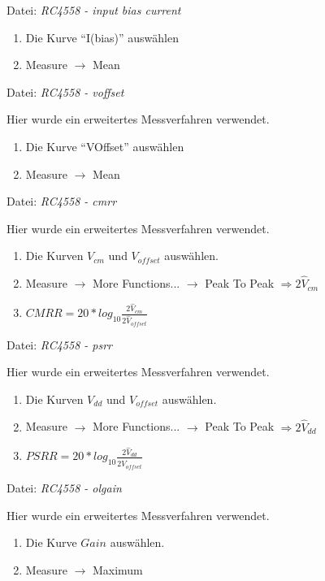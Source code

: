 \documentclass[
	ngerman,
	parskip=half,
	headsepline,
	twocolumn,
	DIV=calc,
	listof=leveldown,
	]{scrartcl}
\begin{document}
	Datei: \emph{RC4558 - input bias current}
	\begin{enumerate}
		\item Die Kurve \enquote{I(bias)} auswählen
		\item Measure $\rightarrow$ Mean
	\end{enumerate}
	
	Datei: \emph{RC4558 - voffset}
	
	Hier wurde ein erweitertes Messverfahren \cite{website:amp_psrr_cmrr_circuits} verwendet.
	\begin{enumerate}
		\item Die Kurve \enquote{VOffset} auswählen
		\item Measure $\rightarrow$ Mean
	\end{enumerate}
	
	Datei: \emph{RC4558 - cmrr}
	
	Hier wurde ein erweitertes Messverfahren \cite{website:amp_psrr_cmrr_circuits} verwendet.
	\begin{enumerate}
		\item Die Kurven $V_{cm}$ und $V_{offset}$ auswählen.
		\item Measure $\rightarrow$ More Functions... $\rightarrow$ Peak To Peak $\Rightarrow 2\hat{V}_{cm}$
		\item $ CMRR = 20 * log_{10} \frac{2\hat{V}_{cm}}{2\hat{V}_{offset}}$
	\end{enumerate}
	
	Datei: \emph{RC4558 - psrr}
	
	Hier wurde ein erweitertes Messverfahren \cite{website:amp_psrr_cmrr_circuits} verwendet.
	\begin{enumerate}
		\item Die Kurven $V_{dd}$ und $V_{offset}$ auswählen.
		\item Measure $\rightarrow$ More Functions... $\rightarrow$ Peak To Peak $\Rightarrow 2\hat{V}_{dd}$
		\item $ PSRR = 20 * log_{10} \frac{2\hat{V}_{dd}}{2\hat{V}_{offset}}$
	\end{enumerate}
	
	Datei: \emph{RC4558 - olgain}
	
	Hier wurde ein erweitertes Messverfahren \cite{website:amp_psrr_cmrr_circuits} verwendet.
	\begin{enumerate}
		\item Die Kurve $Gain$ auswählen.
		\item Measure $\rightarrow$ Maximum
	\end{enumerate}
	
\end{document}
